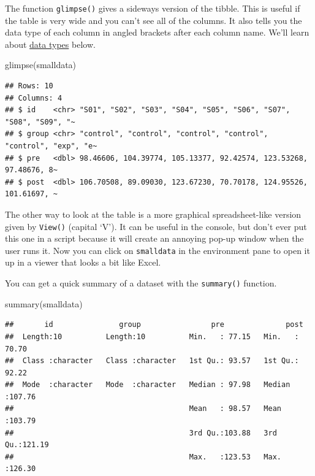 \documentclass[
  oneside]{book}
\newenvironment{Shaded}{\begin{snugshade}}{\end{snugshade}}
\newcommand{\FunctionTok}[1]{\textcolor[rgb]{0.00,0.00,0.00}{#1}}
\newcommand{\NormalTok}[1]{#1}
\begin{document}
The function \texttt{glimpse()} gives a sideways version of the tibble. This is useful if the table is very wide and you can't see all of the columns. It also tells you the data type of each column in angled brackets after each column name. We'll learn about \protect\hyperlink{data_types}{data types} below.

\begin{Shaded}
\begin{Highlighting}[]
\FunctionTok{glimpse}\NormalTok{(smalldata)}
\end{Highlighting}
\end{Shaded}

\begin{verbatim}
## Rows: 10
## Columns: 4
## $ id    <chr> "S01", "S02", "S03", "S04", "S05", "S06", "S07", "S08", "S09", "~
## $ group <chr> "control", "control", "control", "control", "control", "exp", "e~
## $ pre   <dbl> 98.46606, 104.39774, 105.13377, 92.42574, 123.53268, 97.48676, 8~
## $ post  <dbl> 106.70508, 89.09030, 123.67230, 70.70178, 124.95526, 101.61697, ~
\end{verbatim}

The other way to look at the table is a more graphical spreadsheet-like version given by \texttt{View()} (capital `V'). It can be useful in the console, but don't ever put this one in a script because it will create an annoying pop-up window when the user runs it.
Now you can click on \texttt{smalldata} in the environment pane to open it up in a viewer that looks a bit like Excel.

You can get a quick summary of a dataset with the \texttt{summary()} function.

\begin{Shaded}
\begin{Highlighting}[]
\FunctionTok{summary}\NormalTok{(smalldata)}
\end{Highlighting}
\end{Shaded}

\begin{verbatim}
##       id               group                pre              post       
##  Length:10          Length:10          Min.   : 77.15   Min.   : 70.70  
##  Class :character   Class :character   1st Qu.: 93.57   1st Qu.: 92.22  
##  Mode  :character   Mode  :character   Median : 97.98   Median :107.76  
##                                        Mean   : 98.57   Mean   :103.79  
##                                        3rd Qu.:103.88   3rd Qu.:121.19  
##                                        Max.   :123.53   Max.   :126.30
\end{verbatim}
\end{document}

